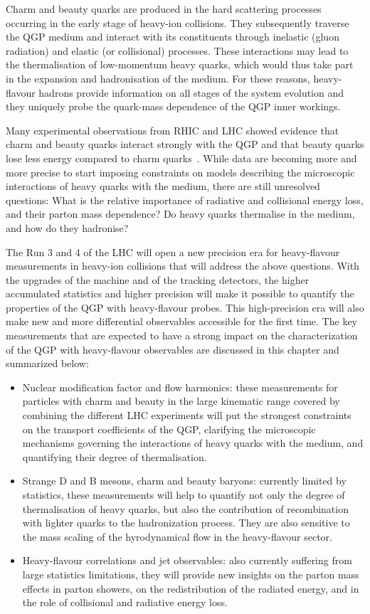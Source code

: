 Charm and beauty quarks are produced in the hard scattering processes occurring in the early stage of heavy-ion collisions. They subsequently traverse the QGP medium and interact with its constituents through inelastic (gluon radiation) and elastic (or collisional) processes.
These interactions may lead to the thermalisation of low-momentum heavy quarks, which would thus take part in the expansion and hadronisation of the medium.
For these reasons, heavy-flavour hadrons provide information on all stages of the system evolution and they uniquely probe the quark-mass dependence of the QGP inner workings.

Many experimental observations from RHIC and LHC showed evidence that charm and beauty quarks interact strongly with the QGP and that beauty quarks lose less energy compared to charm quarks~\cite{Adam:2015nna,Khachatryan:2016ypw}. 
While data are becoming more and more precise to start imposing constraints on models describing the microscopic interactions of heavy quarks with the medium, there are still unresolved questions:  What is the relative importance of radiative and collisional energy loss, and their parton mass dependence? 
Do heavy quarks thermalise in the medium, and how do they hadronise? 

The Run 3 and 4 of the LHC will open a new precision era for heavy-flavour measurements in heavy-ion collisions that will address the above questions. 
With the upgrades of the machine and of the tracking detectors, the higher accumulated statistics and higher precision will make it possible to quantify the properties of the QGP with heavy-flavour probes. This high-precision era will also make new and more differential observables accessible for the first time.
The key measurements that are expected to have a strong impact on the characterization of the QGP with heavy-flavour observables are discussed in this chapter and summarized below:
\begin{itemize}
\item Nuclear modification factor and flow harmonics: these measurements for particles with charm and beauty in the large kinematic range covered by combining the different LHC experiments will put the strongest constraints on the transport coefficients of the QGP, clarifying the microscopic mechanisms governing the interactions of heavy quarks with the medium, and quantifying their degree of thermalisation.
\item Strange D and B mesons, charm and beauty baryons: currently limited by statistics, these measurements will help to quantify not only the degree of thermalisation of heavy quarks, but also the contribution of recombination with lighter quarks to the hadronization process. They are also sensitive to the mass scaling of the hyrodynamical flow in the heavy-flavour sector.

\item Heavy-flavour correlations and jet observables: also currently suffering from large statistics limitations, they will provide new insights on the parton mass effects in parton showers, on the redistribution of the radiated energy, and in the role of collisional and radiative energy loss.

\end{itemize}


